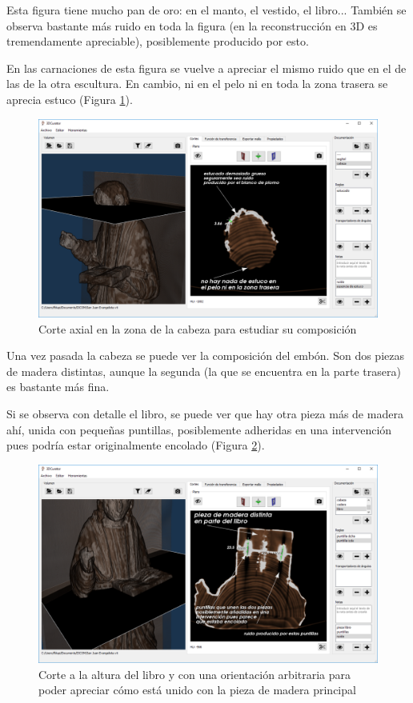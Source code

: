 Esta figura tiene mucho pan de oro: en el manto, el vestido, el libro... También se observa bastante más ruido en toda la figura (en la reconstrucción en 3D es tremendamente apreciable), posiblemente producido por esto.

En las carnaciones de esta figura se vuelve a apreciar el mismo ruido que en el de las de la otra escultura. En cambio, ni en el pelo ni en toda la zona trasera se aprecia estuco (Figura \ref{fig:resultados/documentacion/san-juan-evangelista/cabeza}). 

\begin{figure}[H]
	\centering
	\includegraphics[width=12.5cm]{imagenes/resultados/documentacion/san-juan-evangelista/cabeza}
	\caption{Corte axial en la zona de la cabeza para estudiar su composición}
	\label{fig:resultados/documentacion/san-juan-evangelista/cabeza}
\end{figure}

Una vez pasada la cabeza se puede ver la composición del embón. Son dos piezas de madera distintas, aunque la segunda (la que se encuentra en la parte trasera) es bastante más fina.

Si se observa con detalle el libro, se puede ver que hay otra pieza más de madera ahí, unida con pequeñas puntillas, posiblemente adheridas en una intervención pues podría estar originalmente encolado (Figura \ref{fig:resultados/documentacion/san-juan-evangelista/libro}). 

\begin{figure}[H]
	\centering
	\includegraphics[width=12.5cm]{imagenes/resultados/documentacion/san-juan-evangelista/libro}
	\caption{Corte a la altura del libro y con una orientación arbitraria para poder apreciar cómo está unido con la pieza de madera principal}
	\label{fig:resultados/documentacion/san-juan-evangelista/libro}
\end{figure}

